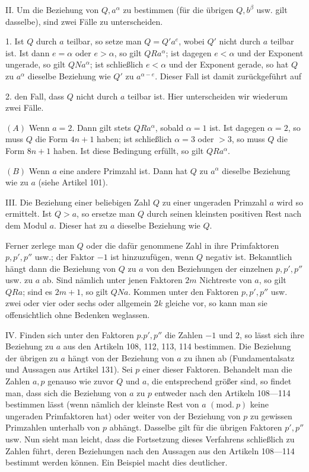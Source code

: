 II. Um die Beziehung von $Q,a^{\alpha}$ zu bestimmen (für die übrigen $Q,b^{\beta}$ usw. gilt dasselbe), sind zwei Fälle zu unterscheiden.

1. Ist $Q$ durch $a$ teilbar, so setze man $Q=Q'a^e$, wobei $Q'$ nicht durch $a$ teilbar ist. Ist dann $e=\alpha$ oder $e>\alpha$, so gilt $QRa^{\alpha}$; ist dagegen $e<\alpha$ und der Exponent ungerade, so gilt $QNa^{\alpha}$; ist schließlich $e<\alpha$ und der Exponent gerade, so hat $Q$ zu $a^{\alpha}$ dieselbe Beziehung wie $Q'$ zu $a^{\alpha-e}$. Dieser Fall ist damit zurückgeführt auf

2. den Fall, dass $Q$ nicht durch $a$ teilbar ist. Hier unterscheiden wir wiederum zwei Fälle.

$(A)$ Wenn $a=2$. Dann gilt stets $QRa^{\alpha}$, sobald $\alpha=1$ ist. Ist dagegen $\alpha=2$, so muss $Q$ die Form $4n+1$ haben; ist schließlich $\alpha=3$ oder $>3$, so muss $Q$ die Form $8n+1$ haben. Ist diese Bedingung erfüllt, so gilt $QRa^{\alpha}$.

$(B)$ Wenn $a$ eine andere Primzahl ist. Dann hat $Q$ zu $a^{\alpha}$ dieselbe Beziehung wie zu $a$ (siehe Artikel 101).

III. Die Beziehung einer beliebigen Zahl $Q$ zu einer ungeraden Primzahl $a$ wird so ermittelt. Ist $Q>a$, so ersetze man $Q$ durch seinen kleinsten positiven Rest nach dem Modul $a$. Dieser hat zu $a$ dieselbe Beziehung wie $Q$.

Ferner zerlege man $Q$ oder die dafür genommene Zahl in ihre Primfaktoren $p,p',p''$ usw.; der Faktor $-1$ ist hinzuzufügen, wenn $Q$ negativ ist. Bekanntlich hängt dann die Beziehung von $Q$ zu $a$ von den Beziehungen der einzelnen $p,p',p''$ usw. zu $a$ ab. Sind nämlich unter jenen Faktoren $2m$ Nichtreste von $a$, so gilt $QRa$; sind es $2m+1$, so gilt $QNa$. Kommen unter den Faktoren $p,p',p''$ usw. zwei oder vier oder sechs oder allgemein $2k$ gleiche vor, so kann man sie offensichtlich ohne Bedenken weglassen.

IV. Finden sich unter den Faktoren $p.p',p''$ die Zahlen $-1$ und $2$, so lässt sich ihre Beziehung zu $a$ aus den Artikeln 108, 112, 113, 114 bestimmen. Die Beziehung der übrigen zu $a$ hängt von der Beziehung von $a$ zu ihnen ab (Fundamentalsatz und Aussagen aus Artikel 131). Sei $p$ einer dieser Faktoren. Behandelt man die Zahlen $a,p$ genauso wie zuvor $Q$ und $a$, die entsprechend größer sind, so findet man, dass sich die Beziehung von $a$ zu $p$ entweder nach den Artikeln 108---114 bestimmen lässt (wenn nämlich der kleinste Rest von $a$ $(\mathrm{mod.}\ p)$ keine ungeraden Primfaktoren hat) oder weiter von der Beziehung von $p$ zu gewissen Primzahlen unterhalb von $p$ abhängt. Dasselbe gilt für die übrigen Faktoren $p',p''$ usw. Nun sieht man leicht, dass die Fortsetzung dieses Verfahrens schließlich zu Zahlen führt, deren Beziehungen nach den Aussagen aus den Artikeln 108---114 bestimmt werden können. Ein Beispiel macht dies deutlicher.

